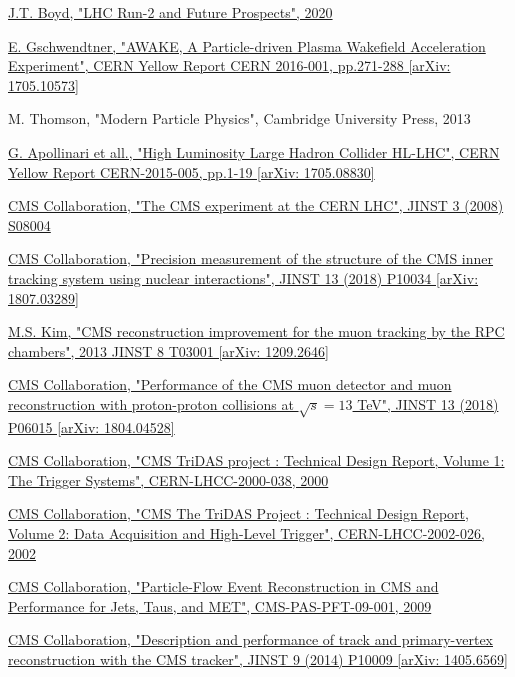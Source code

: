 \documentclass[a4paper, 10pt, openright]{report}
\begin{document}
\begin{thebibliography}{1}
\href{https://www.researchgate.net/publication/338569771_LHC_Run-2_and_Future_Prospects}{J.T. Boyd,
"LHC Run-2 and Future Prospects",
2020}

\href{https://arxiv.org/abs/1705.10573}{E. Gschwendtner,
"AWAKE, A Particle-driven Plasma Wakefield Acceleration Experiment",
CERN Yellow Report CERN 2016-001, pp.271-288 [arXiv: 1705.10573]
}

M. Thomson,
"Modern Particle Physics",
Cambridge University Press, 2013

\href{https://arxiv.org/abs/1705.08830}{G. Apollinari et all.,
"High Luminosity Large Hadron Collider HL-LHC",
CERN Yellow Report CERN-2015-005, pp.1-19 [arXiv: 1705.08830]
}

\href{https://iopscience.iop.org/article/10.1088/1748-0221/3/08/S08004/pdf}{CMS Collaboration,
"The CMS experiment at the CERN LHC",
JINST 3 (2008) S08004
}

\href{https://arxiv.org/abs/1807.03289}{CMS Collaboration,
"Precision measurement of the structure of the CMS inner tracking system using nuclear interactions",
JINST 13 (2018) P10034 [arXiv: 1807.03289]
}

\href{https://arxiv.org/abs/1209.2646}{M.S. Kim,
"CMS reconstruction improvement for the muon tracking by the RPC chambers",
2013 JINST 8 T03001 [arXiv: 1209.2646]}

\href{https://arxiv.org/abs/1804.04528}{CMS Collaboration,
"Performance of the CMS muon detector and muon reconstruction with proton-proton collisions at $\sqrt{s} = 13$ TeV",
JINST 13 (2018) P06015 [arXiv: 1804.04528]}

\href{http://cdsweb.cern.ch/record/706847}{CMS Collaboration,
"CMS TriDAS project : Technical Design Report, Volume 1: The Trigger Systems",
CERN-LHCC-2000-038, 2000}

\href{http://cdsweb.cern.ch/record/578006}{CMS Collaboration,
"CMS The TriDAS Project : Technical Design Report, Volume 2: Data Acquisition and High-Level Trigger",
CERN-LHCC-2002-026, 2002}

\href{http://inspirehep.net/record/925379/}{CMS Collaboration,
"Particle-Flow Event Reconstruction in CMS and Performance for Jets, Taus, and MET",
CMS-PAS-PFT-09-001, 2009}

\href{https://arxiv.org/abs/1405.6569}{CMS Collaboration,
"Description and performance of track and primary-vertex reconstruction with the CMS tracker",
JINST 9 (2014) P10009 [arXiv: 1405.6569]}


\end{thebibliography}
\end{document}

